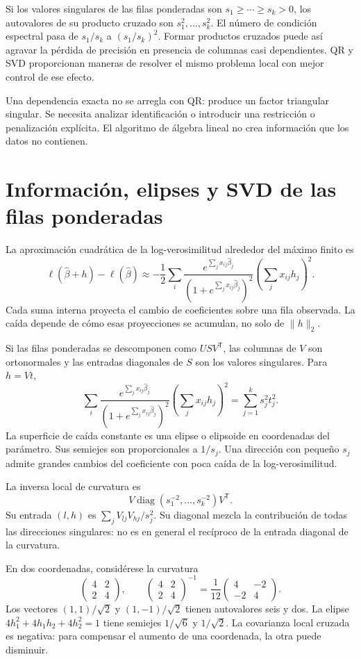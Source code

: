 \documentclass[11pt,a4paper]{article}
\newcommand{\T}{^{\mathsf T}}
\DeclareMathOperator{\diag}{diag}
\begin{document}
Si los valores singulares de las filas ponderadas son
\(s_1\ge\cdots\ge s_k>0\), los autovalores de su
producto cruzado son \(s_1^2,\ldots,s_k^2\).
El número de condición espectral pasa de \(s_1/s_k\)
a \((s_1/s_k)^2\).
Formar productos cruzados puede así agravar la pérdida
de precisión en presencia de columnas casi dependientes.
QR y SVD proporcionan maneras de resolver el mismo
problema local con mejor control de ese efecto.

Una dependencia exacta no se arregla con QR:
produce un factor triangular singular.
Se necesita analizar identificación o introducir una
restricción o penalización explícita.
El algoritmo de álgebra lineal no crea información
que los datos no contienen.

\clearpage
\section{Información, elipses y SVD de las filas ponderadas}\label{logit76}
La aproximación cuadrática de la log-verosimilitud alrededor
del máximo finito es
\[
\ell(\widehat\beta+h)-\ell(\widehat\beta)
\approx-\frac12\sum_i
\frac{e^{\sum_jx_{ij}\widehat\beta_j}}
{(1+e^{\sum_jx_{ij}\widehat\beta_j})^2}
\left(\sum_jx_{ij}h_j\right)^2.
\]
Cada suma interna proyecta el cambio de coeficientes
sobre una fila observada. La caída depende de cómo
esas proyecciones se acumulan, no solo de \(\|h\|_2\).

Si las filas ponderadas se descomponen como \(USV\T\),
las columnas de \(V\) son ortonormales y las entradas
diagonales de \(S\) son los valores singulares.
Para \(h=Vt\),
\[
\sum_i\frac{e^{\sum_jx_{ij}\widehat\beta_j}}
{(1+e^{\sum_jx_{ij}\widehat\beta_j})^2}
\left(\sum_jx_{ij}h_j\right)^2
=\sum_{j=1}^k s_j^2t_j^2.
\]
La superficie de caída constante es una elipse o elipsoide
en coordenadas del parámetro. Sus semiejes son
proporcionales a \(1/s_j\).
Una dirección con pequeño \(s_j\) admite grandes cambios
del coeficiente con poca caída de la log-verosimilitud.

La inversa local de curvatura es
\[
V\diag(s_1^{-2},\ldots,s_k^{-2})V\T.
\]
Su entrada \((l,h)\) es
\(\sum_j V_{lj}V_{hj}/s_j^2\).
Su diagonal mezcla la contribución de todas las direcciones
singulares: no es en general el recíproco de la entrada
diagonal de la curvatura.

En dos coordenadas, considérese la curvatura
\[
\begin{pmatrix}4&2\\2&4\end{pmatrix},
\qquad
\begin{pmatrix}4&2\\2&4\end{pmatrix}^{-1}
=\frac1{12}\begin{pmatrix}4&-2\\-2&4\end{pmatrix}.
\]
Los vectores \((1,1)/\sqrt2\) y \((1,-1)/\sqrt2\)
tienen autovalores seis y dos.
La elipse \(4h_1^2+4h_1h_2+4h_2^2=1\)
tiene semiejes \(1/\sqrt6\) y \(1/\sqrt2\).
La covarianza local cruzada es negativa:
para compensar el aumento de una coordenada,
la otra puede disminuir.
\end{document}
